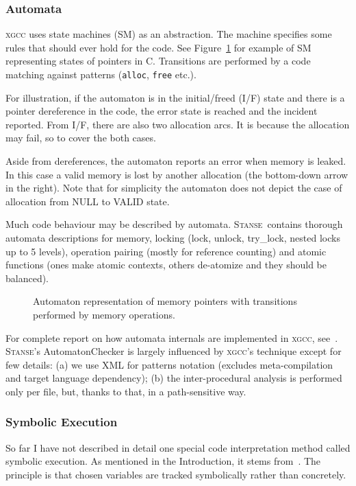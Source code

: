 \documentclass[11pt,a4paper]{article}
\newcommand{\stan}{\textsc{Stanse}}
\begin{document}
\subsubsection{Automata}
\label{automata}
\textsc{xgcc} uses state machines (SM) as an abstraction. The machine specifies
some rules that should ever hold for the code. See Figure~\ref{fig.auto_mem}
for example of SM representing states of pointers in C. Transitions are
performed by a code matching against patterns (\texttt{alloc}, \texttt{free}
etc.).

For illustration, if the automaton is in the initial/freed (I/F) state and
there is a pointer dereference in the code, the error state is reached and the
incident reported. From I/F, there are also two allocation arcs. It is because
the allocation may fail, so to cover the both cases.

Aside from dereferences, the automaton reports an error when memory is leaked.
In this case a valid memory is lost by another allocation (the bottom-down
arrow in the right). Note that for simplicity the automaton does not depict
the case of allocation from NULL to VALID state.

Much code behaviour may be described by automata. \stan\ contains thorough
automata descriptions for memory, locking (lock, unlock, try\_lock, nested
locks up to 5 levels), operation pairing (mostly for reference counting) and
atomic functions (ones make atomic contexts, others de-atomize and they should
be balanced).

\begin{figure}[htb]
\begin{center}

\end{center}
\caption{Automaton representation of memory pointers with transitions
performed by memory operations.}
\label{fig.auto_mem}
\end{figure}

For complete report on how automata internals are implemented in
\textsc{xgcc}, see~\cite{metal}. \stan's AutomatonChecker is largely
influenced by \textsc{xgcc}'s technique except for few details: (a) we use XML
for patterns notation (excludes meta-compilation and target language
dependency); (b) the inter-procedural analysis is performed only per file,
but, thanks to that, in a path-sensitive way.

\subsubsection{Symbolic Execution}
\label{current-se}
So far I have not described in detail one special code interpretation method
called symbolic execution. As mentioned in the Introduction, it stems
from~\cite{select}. The principle is that chosen variables are tracked
symbolically rather than concretely.
\end{document}
